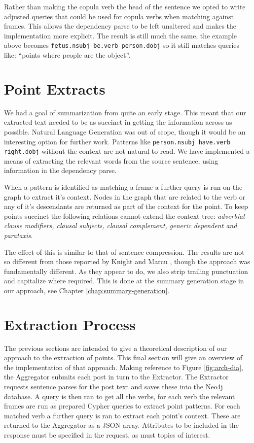       Rather than making the copula verb the head of the sentence we opted to write adjusted queries that could be used for copula verbs when matching against frames. This allows the dependency parse to be left unaltered and makes the implementation more explicit. The result is still much the same, the example above becomes \texttt{fetus.nsubj be.verb person.dobj} so it still matches queries like: ``points where people are the object''.

  \section{Point Extracts}
    We had a goal of summarization from quite an early stage. This meant that our extracted text needed to be as succinct in getting the information across as possible. Natural Language Generation was out of scope, though it would be an interesting option for further work. Patterns like \texttt{person.nsubj have.verb right.dobj} without the context are not natural to read. We have implemented a means of extracting the relevant words from the source sentence, using information in the dependency parse.

    When a pattern is identified as matching a frame a further query is run on the graph to extract it's context. Nodes in the graph that are related to the verb or any of it's descendants are returned as part of the context for the point. To keep points succinct the following relations cannot extend the context tree: \textit{adverbial clause modifiers, clausal subjects, clausal complement, generic dependent and parataxis}.

    The effect of this is similar to that of sentence compression. The results are not so different from those reported by Knight and Marcu \cite{knight2000statistics}, though the approach was fundamentally different. As they appear to do, we also strip trailing punctuation and capitalize where required. This is done at the summary generation stage in our approach, see Chapter \ref{chap:summary-generation}.

  \section{Extraction Process}
    The previous sections are intended to give a theoretical description of our approach to the extraction of points. This final section will give an overview of the implementation of that approach.
    Making reference to Figure \ref{fig:arch-dia}, the Aggregator submits each post in turn to the Extractor. The Extractor requests sentence parses for the post text and saves these into the Neo4j database. A query is then ran to get all the verbs, for each verb the relevant frames are run as prepared Cypher queries to extract point patterns. For each matched verb a further query is ran to extract each point's context. These are returned to the Aggregator as a JSON array. Attributes to be included in the response must be specified in the request, as must topics of interest.

